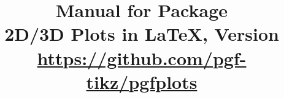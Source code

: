 \documentclass[a4paper,openany]{book}
\title{%
    Manual for Package \PGFPlots{}\\
    {\small 2D/3D Plots in \LaTeX{}, Version \pgfplotsversion}\\
    {\small\url{https://github.com/pgf-tikz/pgfplots}}
}
\let\bookmaketitle=\maketitle
\begin{document}
\def\plotcoords{%
\addplot coordinates {
(5,8.312e-02)    (17,2.547e-02)   (49,7.407e-03)
(129,2.102e-03)  (321,5.874e-04)  (769,1.623e-04)
(1793,4.442e-05) (4097,1.207e-05) (9217,3.261e-06)
};

\addplot coordinates{
(7,8.472e-02)    (31,3.044e-02)    (111,1.022e-02)
(351,3.303e-03)  (1023,1.039e-03)  (2815,3.196e-04)
(7423,9.658e-05) (18943,2.873e-05) (47103,8.437e-06)
};

\addplot coordinates{
(9,7.881e-02)     (49,3.243e-02)    (209,1.232e-02)
(769,4.454e-03)   (2561,1.551e-03)  (7937,5.236e-04)
(23297,1.723e-04) (65537,5.545e-05) (178177,1.751e-05)
};

\addplot coordinates{
(11,6.887e-02)    (71,3.177e-02)     (351,1.341e-02)
(1471,5.334e-03)  (5503,2.027e-03)   (18943,7.415e-04)
(61183,2.628e-04) (187903,9.063e-05) (553983,3.053e-05)
};

\addplot coordinates{
(13,5.755e-02)     (97,2.925e-02)     (545,1.351e-02)
(2561,5.842e-03)   (10625,2.397e-03)  (40193,9.414e-04)
(141569,3.564e-04) (471041,1.308e-04)
(1496065,4.670e-05)
};
}%


\bookmaketitle
\tableofcontents









\printindex

\nocite{pgfplotstable}
\nocite{programmingnotes}

\end{document}
